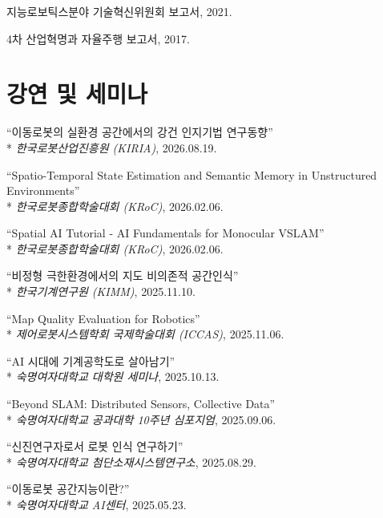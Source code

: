 \documentclass[margin]{res}
\begin{document}
\begin{resume}
		\par 지능로보틱스분야 기술혁신위원회 보고서, 2021.

		\par 4차 산업혁명과 자율주행 보고서, 2017.

		\section{강연 및 세미나}
		\begingroup\raggedright
		\par ``이동로봇의 실환경 공간에서의 강건 인지기법 연구동향''\\*
		\textit{한국로봇산업진흥원 (KIRIA)}, 2026.08.19.

		\par ``Spatio-Temporal State Estimation and Semantic Memory in Unstructured Environments''\\*
		\textit{한국로봇종합학술대회 (KRoC)}, 2026.02.06.

		\par ``Spatial AI Tutorial - AI Fundamentals for Monocular VSLAM''\\*
		\textit{한국로봇종합학술대회 (KRoC)}, 2026.02.06.

		\par ``비정형 극한환경에서의 지도 비의존적 공간인식''\\*
		\textit{한국기계연구원 (KIMM)}, 2025.11.10.

		\par ``Map Quality Evaluation for Robotics''\\*
		\textit{제어로봇시스템학회 국제학술대회 (ICCAS)}, 2025.11.06.

		\par ``AI 시대에 기계공학도로 살아남기''\\*
		\textit{숙명여자대학교 대학원 세미나}, 2025.10.13.

		\par ``Beyond SLAM: Distributed Sensors, Collective Data''\\*
		\textit{숙명여자대학교 공과대학 10주년 심포지엄}, 2025.09.06.

		\par ``신진연구자로서 로봇 인식 연구하기''\\*
		\textit{숙명여자대학교 첨단소재시스템연구소}, 2025.08.29.

		\par ``이동로봇 공간지능이란?''\\*
		\textit{숙명여자대학교 AI센터}, 2025.05.23.


\end{resume}
\end{document}
